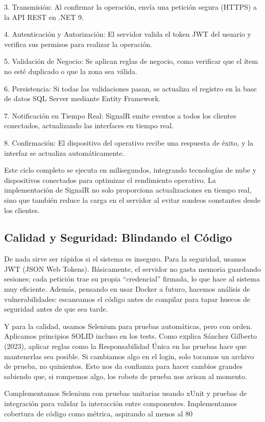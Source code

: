 3. Transmisión: Al confirmar la operación, envía una petición segura (HTTPS) a la API REST en .NET 9.

4. Autenticación y Autorización: El servidor valida el token JWT del usuario y verifica sus permisos para realizar la operación.

5. Validación de Negocio: Se aplican reglas de negocio, como verificar que el ítem no esté duplicado o que la zona sea válida.

6. Persistencia: Si todas las validaciones pasan, se actualiza el registro en la base de datos SQL Server mediante Entity Framework.

7. Notificación en Tiempo Real: SignalR emite eventos a todos los clientes conectados, actualizando las interfaces en tiempo real.

8. Confirmación: El dispositivo del operativo recibe una respuesta de éxito, y la interfaz se actualiza automáticamente.

Este ciclo completo se ejecuta en milisegundos, integrando tecnologías de nube y dispositivos conectados para optimizar el rendimiento operativo. La implementación de SignalR no solo proporciona actualizaciones en tiempo real, sino que también reduce la carga en el servidor al evitar sondeos constantes desde los clientes.

\subsection{Calidad y Seguridad: Blindando el Código}
De nada sirve ser rápidos si el sistema es inseguro. Para la seguridad, usamos JWT (JSON Web Tokens). Básicamente, el servidor no gasta memoria guardando sesiones; cada petición trae su propia ``credencial'' firmada, lo que hace al sistema muy eficiente. Además, pensando en usar Docker a futuro, hacemos análisis de vulnerabilidades: escaneamos el código antes de compilar para tapar huecos de seguridad antes de que sea tarde.

Y para la calidad, usamos Selenium para pruebas automáticas, pero con orden. Aplicamos principios SOLID incluso en los tests. Como explica Sánchez Gilberto (2023), aplicar reglas como la Responsabilidad Única en las pruebas hace que mantenerlas sea posible. Si cambiamos algo en el login, solo tocamos un archivo de prueba, no quinientos. Esto nos da confianza para hacer cambios grandes sabiendo que, si rompemos algo, los robots de prueba nos avisan al momento.

Complementamos Selenium con pruebas unitarias usando xUnit y pruebas de integración para validar la interacción entre componentes. Implementamos cobertura de código como métrica, aspirando al menos al 80%

